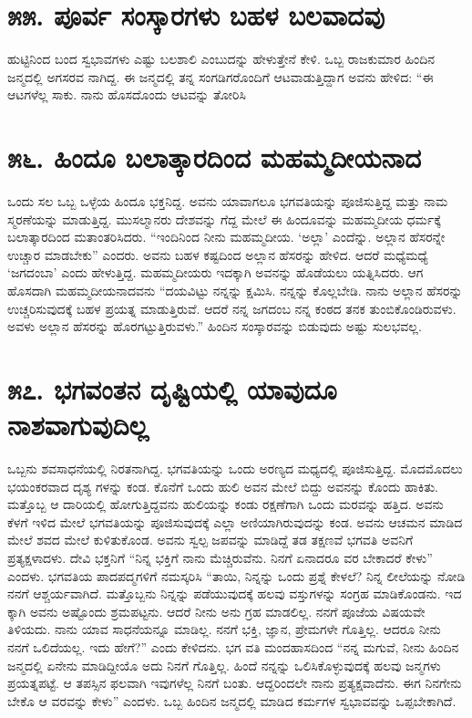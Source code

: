 \section{\num{೫೫. } ಪೂರ್ವ ಸಂಸ್ಕಾರಗಳು ಬಹಳ ಬಲವಾದವು}

ಹುಟ್ಟಿನಿಂದ ಬಂದ ಸ್ವಭಾವಗಳು ಎಷ್ಟು ಬಲಶಾಲಿ ಎಂಬುದನ್ನು ಹೇಳುತ್ತೇನೆ ಕೇಳಿ. ಒಬ್ಬ ರಾಜಕುಮಾರ ಹಿಂದಿನ ಜನ್ಮದಲ್ಲಿ ಅಗಸರವ ನಾಗಿದ್ದ. ಈ ಜನ್ಮದಲ್ಲಿ ತನ್ನ ಸಂಗಡಿಗರೊಂದಿಗೆ ಆಟವಾಡುತ್ತಿದ್ದಾಗ ಅವನು ಹೇಳಿದ: “ಈ ಆಟಗಳೆಲ್ಲ ಸಾಕು. ನಾನು ಹೊಸದೊಂದು ಆಟವನ್ನು ತೋರಿಸಿ



\section{\num{೫೬. } ಹಿಂದೂ ಬಲಾತ್ಕಾರದಿಂದ ಮಹಮ್ಮದೀಯನಾದ}

ಒಂದು ಸಲ ಒಬ್ಬ ಒಳ್ಳೆಯ ಹಿಂದೂ ಭಕ್ತನಿದ್ದ. ಅವನು ಯಾವಾಗಲೂ ಭಗವತಿಯನ್ನು ಪೂಜಿಸುತ್ತಿದ್ದ ಮತ್ತು ನಾಮ ಸ್ಮರಣೆಯನ್ನು ಮಾಡುತ್ತಿದ್ದ. ಮುಸಲ್ಮಾನರು ದೇಶವನ್ನು ಗೆದ್ದ ಮೇಲೆ ಈ ಹಿಂದೂವನ್ನು ಮಹಮ್ಮದೀಯ ಧರ್ಮಕ್ಕೆ ಬಲಾತ್ಕಾರದಿಂದ ಮತಾಂತರಿಸಿದರು. “ಇಂದಿನಿಂದ ನೀನು ಮಹಮ್ಮದೀಯ. ‘ಅಲ್ಲಾ’ ಎಂದೆನ್ನು. ಅಲ್ಲಾನ ಹೆಸರನ್ನೇ ಉಚ್ಚಾರ ಮಾಡಬೇಕು” ಎಂದರು. ಅವನು ಬಹಳ ಕಷ್ಟದಿಂದ ಅಲ್ಲಾನ ಹೆಸರನ್ನು ಹೇಳಿದ. ಆದರೆ ಮಧ್ಯೆಮಧ್ಯೆ ‘ಜಗದಂಬಾ’ ಎಂದು ಹೇಳುತ್ತಿದ್ದ. ಮಹಮ್ಮದೀಯರು ಇದಕ್ಕಾಗಿ ಅವನನ್ನು ಹೊಡೆಯಲು ಯತ್ನಿಸಿದರು. ಆಗ ಹೊಸದಾಗಿ ಮಹಮ್ಮದೀಯನಾದವನು “ದಯವಿಟ್ಟು ನನ್ನನ್ನು ಕ್ಷಮಿಸಿ. ನನ್ನನ್ನು ಕೊಲ್ಲಬೇಡಿ. ನಾನು ಅಲ್ಲಾನ ಹೆಸರನ್ನು ಉಚ್ಚರಿಸುವುದಕ್ಕೆ ಬಹಳ ಪ್ರಯತ್ನ ಮಾಡುತ್ತಿರುವೆ. ಆದರೆ ನನ್ನ ಜಗದಂಬ ನನ್ನ ಕಂಠದ ತನಕ ತುಂಬಿಕೊಂಡಿರುವಳು. ಅವಳು ಅಲ್ಲಾನ ಹೆಸರನ್ನು ಹೊರಗಟ್ಟುತ್ತಿರುವಳು.” ಹಿಂದಿನ ಸಂಸ್ಕಾರವನ್ನು ಬಿಡುವುದು ಅಷ್ಟು ಸುಲಭವಲ್ಲ.


\section{\num{೫೭. } ಭಗವಂತನ ದೃಷ್ಟಿಯಲ್ಲಿ ಯಾವುದೂ ನಾಶವಾಗುವುದಿಲ್ಲ}

ಒಬ್ಬನು ಶವಸಾಧನೆಯಲ್ಲಿ ನಿರತನಾಗಿದ್ದ. ಭಗವತಿಯನ್ನು ಒಂದು ಅರಣ್ಯದ ಮಧ್ಯದಲ್ಲಿ ಪೂಜಿಸುತ್ತಿದ್ದ. ಮೊದಮೊದಲು ಭಯಂಕರವಾದ ದೃಶ್ಯ ಗಳನ್ನು ಕಂಡ. ಕೊನೆಗೆ ಒಂದು ಹುಲಿ ಅವನ ಮೇಲೆ ಬಿದ್ದು ಅವನನ್ನು ಕೊಂದು ಹಾಕಿತು. ಮತ್ತೊಬ್ಬ ಆ ದಾರಿಯಲ್ಲಿ ಹೋಗುತ್ತಿದ್ದವನು ಹುಲಿಯನ್ನು ಕಂಡು ರಕ್ಷಣೆಗಾಗಿ ಒಂದು ಮರವನ್ನು ಹತ್ತಿದ. ಅವನು ಕೆಳಗೆ ಇಳಿದ ಮೇಲೆ ಭಗವತಿಯನ್ನು ಪೂಜಿಸುವುದಕ್ಕೆ ಎಲ್ಲಾ ಅಣಿಯಾಗಿರುವುದನ್ನು ಕಂಡ. ಅವನು ಆಚಮನ ಮಾಡಿದ ಮೇಲೆ ಶವದ ಮೇಲೆ ಕುಳಿತುಕೊಂಡ. ಅವನು ಸ್ವಲ್ಪ ಜಪವನ್ನು ಮಾಡಿದ್ದೆ ತಡ ತಕ್ಷಣವೆ ಭಗವತಿ ಅವನಿಗೆ ಪ್ರತ್ಯಕ್ಷಳಾದಳು. ದೇವಿ ಭಕ್ತನಿಗೆ “ನಿನ್ನ ಭಕ್ತಿಗೆ ನಾನು ಮೆಚ್ಚಿರುವೆನು. ನಿನಗೆ ಏನಾದರೂ ವರ ಬೇಕಾದರೆ ಕೇಳು” ಎಂದಳು. ಭಗವತಿಯ ಪಾದಪದ್ಮಗಳಿಗೆ ನಮಸ್ಕರಿಸಿ “ತಾಯಿ, ನಿನ್ನನ್ನು ಒಂದು ಪ್ರಶ್ನೆ ಕೇಳಲೆ? ನಿನ್ನ ಲೀಲೆಯನ್ನು ನೋಡಿ ನನಗೆ ಆಶ್ಚರ್ಯವಾಗಿದೆ. ಮತ್ತೊಬ್ಬನು ನಿನ್ನನ್ನು ಪಡೆಯುವುದಕ್ಕೆ ಹಲವು ವಸ್ತುಗಳನ್ನು ಸಂಗ್ರಹ ಮಾಡಿಕೊಂಡನು. ಇದ ಕ್ಕಾಗಿ ಅವನು ಅಷ್ಟೊಂದು ಶ್ರಮಪಟ್ಟನು. ಆದರೆ ನೀನು ಅನು ಗ್ರಹ ಮಾಡಲಿಲ್ಲ. ನನಗೆ ಪೂಜೆಯ ವಿಷಯವೇ ತಿಳಿಯದು. ನಾನು ಯಾವ ಸಾಧನೆಯನ್ನೂ ಮಾಡಿಲ್ಲ. ನನಗೆ ಭಕ್ತಿ, ಜ್ಞಾನ, ಪ್ರೇಮಗಳೇ ಗೊತ್ತಿಲ್ಲ. ಆದರೂ ನೀನು ನನಗೆ ಒಲಿದೆಯಲ್ಲ. ಇದು ಹೇಗೆ?” ಎಂದು ಕೇಳಿದನು. ಭಗ ವತಿ ಮಂದಹಾಸದಿಂದ “ನನ್ನ ಮಗುವೆ, ನೀನು ಹಿಂದಿನ ಜನ್ಮದಲ್ಲಿ ಏನೇನು ಮಾಡಿದ್ದೀಯೊ ಅದು ನಿನಗೆ ಗೊತ್ತಿಲ್ಲ. ಹಿಂದೆ ನನ್ನನ್ನು ಒಲಿಸಿಕೊಳ್ಳುವುದಕ್ಕೆ ಹಲವು ಜನ್ಮಗಳು ಪ್ರಯತ್ನಪಟ್ಟೆ. ಆ ತಪಸ್ಸಿನ ಫಲವಾಗಿ ಇವುಗಳೆಲ್ಲ ನಿನಗೆ ಬಂತು. ಆದ್ದರಿಂದಲೇ ನಾನು ಪ್ರತ್ಯಕ್ಷವಾದೆನು. ಈಗ ನಿನಗೇನು ಬೇಕೊ ಆ ವರವನ್ನು ಕೇಳು” ಎಂದಳು. ಒಬ್ಬ ಹಿಂದಿನ ಜನ್ಮದಲ್ಲಿ ಮಾಡಿದ ಕರ್ಮಗಳ ಸ್ವಭಾವವನ್ನು ಒಪ್ಪಬೇಕಾಗಿದೆ.


